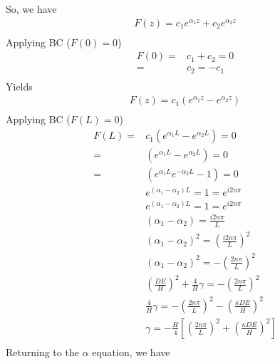 \documentclass[11pt]{article}
\begin{document}
So, we have
\begin{equation}\begin{aligned}
	F(z) = c_1 e^{\alpha_1 z} + c_2 e^{\alpha_2 z} \\
\end{aligned} \end{equation}
Applying BC ($F(0) = 0$)
\begin{equation}\begin{aligned}
	F(0) = & c_1 + c_2 = 0 \\
	     = & c_2 =-c_1  \\
\end{aligned} \end{equation}
Yields
\begin{equation}\begin{aligned}
	F(z) = c_1 (e^{\alpha_1 z} - e^{\alpha_2 z}) \\
\end{aligned} \end{equation}
Applying BC ($F(L) = 0$)
\begin{equation}\begin{aligned}
	F(L) = & c_1 (e^{\alpha_1 L} - e^{\alpha_2 L}) = 0 \\
	     = &     (e^{\alpha_1 L} - e^{\alpha_2 L}) = 0 \\
	     = &     (e^{\alpha_1 L}e^{-\alpha_2 L} - 1) = 0 \\
	       &     e^{(\alpha_1-\alpha_2) L} = 1 = e^{i2n\pi} \\
	       &     e^{(\alpha_1-\alpha_2) L} = 1 = e^{i2n\pi} \\
	       &     (\alpha_1-\alpha_2) = \frac{i2n\pi}{L} \\
	       &     (\alpha_1-\alpha_2)^2 = \left( \frac{i2n\pi}{L} \right)^2 \\
	       &     (\alpha_1-\alpha_2)^2 = - \left( \frac{2n\pi}{L} \right)^2 \\
	       &     \left(\frac{DE}{H}\right)^2 + \frac{4}{H} \gamma = - \left( \frac{2n\pi}{L} \right)^2 \\
	       &     \frac{4}{H} \gamma = - \left( \frac{2n\pi}{L} \right)^2 - \left(\frac{\kappa DE}{H}\right)^2 \\
	       &     \gamma = - \frac{H}{4} \left[ \left( \frac{2n\pi}{L} \right)^2 + \left(\frac{\kappa DE}{H}\right)^2 \right] \\
\end{aligned} \end{equation}
Returning to the $\alpha$ equation, we have
\end{document}
